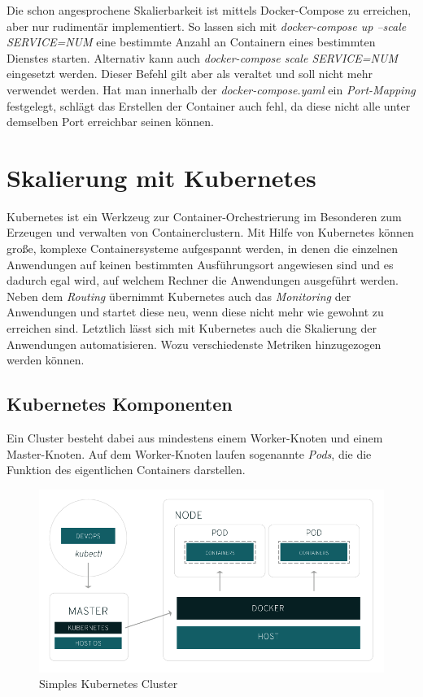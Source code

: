 \documentclass[12pt,a4paper]{scrartcl}
\begin{document}
Die schon angesprochene Skalierbarkeit ist mittels Docker-Compose zu erreichen, aber nur rudimentär implementiert. So lassen sich mit \emph{docker-compose up --scale SERVICE=NUM} eine bestimmte Anzahl an Containern eines bestimmten Dienstes starten. Alternativ kann auch \emph{docker-compose scale SERVICE=NUM} eingesetzt werden. Dieser Befehl gilt aber als veraltet und soll nicht mehr verwendet werden. Hat man innerhalb der \emph{docker-compose.yaml} ein \emph{Port-Mapping} festgelegt, schlägt das Erstellen der Container auch fehl, da diese nicht alle unter demselben Port erreichbar seinen können.


\newpage
\section{Skalierung mit Kubernetes} \label{kubernetes}

Kubernetes ist ein Werkzeug zur Container-Orchestrierung im Besonderen zum Erzeugen und verwalten von Containerclustern. Mit Hilfe von Kubernetes können große, komplexe Containersysteme aufgespannt werden, in denen die einzelnen Anwendungen auf keinen bestimmten Ausführungsort angewiesen sind und es dadurch egal wird, auf welchem Rechner die Anwendungen ausgeführt werden. Neben dem \emph{Routing} übernimmt Kubernetes auch das \emph{Monitoring} der Anwendungen und startet diese neu, wenn diese nicht mehr wie gewohnt zu erreichen sind. Letztlich lässt sich mit Kubernetes auch die Skalierung der Anwendungen automatisieren. Wozu verschiedenste Metriken hinzugezogen werden können. 

\subsection{Kubernetes Komponenten}

Ein Cluster besteht dabei aus mindestens einem Worker-Knoten und einem Master-Knoten. Auf dem Worker-Knoten laufen sogenannte \emph{Pods}, die die Funktion des eigentlichen Containers darstellen. 

\begin{figure}[h!]
	\centering
	\includegraphics[scale=0.5]{KubeSimpleCluster.png}
	\caption[https://www.redhat.com/de/topics/containers/what-is-kubernetes]{Simples Kubernetes Cluster}
\end{figure}
\end{document}
